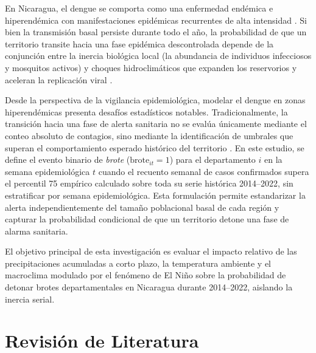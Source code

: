 \documentclass[11pt,a4paper]{article}
\begin{document}
\medskip

En Nicaragua, el dengue se comporta como una enfermedad endémica e hiperendémica con manifestaciones epidémicas recurrentes de alta intensidad \parencite{gordon2013pediatric}. Si bien la transmisión basal persiste durante todo el año, la probabilidad de que un territorio transite hacia una fase epidémica descontrolada depende de la conjunción entre la inercia biológica local (la abundancia de individuos infecciosos y mosquitos activos) y choques hidroclimáticos que expanden los reservorios y aceleran la replicación viral \parencite{anyamba2019global, suazo2026abundance}.

\medskip

Desde la perspectiva de la vigilancia epidemiológica, modelar el dengue en zonas hiperendémicas presenta desafíos estadísticos notables. Tradicionalmente, la transición hacia una fase de alerta sanitaria no se evalúa únicamente mediante el conteo absoluto de contagios, sino mediante la identificación de umbrales que superan el comportamiento esperado histórico del territorio \parencite{paho2002modulos}. En este estudio, se define el evento binario de \textit{brote} ($\text{brote}_{it} = 1$) para el departamento $i$ en la semana epidemiológica $t$ cuando el recuento semanal de casos confirmados supera el percentil 75 empírico calculado sobre toda su serie histórica 2014--2022, sin estratificar por semana epidemiológica. Esta formulación permite estandarizar la alerta independientemente del tamaño poblacional basal de cada región y capturar la probabilidad condicional de que un territorio detone una fase de alarma sanitaria.

\medskip

El objetivo principal de esta investigación es evaluar el impacto relativo de las precipitaciones acumuladas a corto plazo, la temperatura ambiente y el macroclima modulado por el fenómeno de El Niño sobre la probabilidad de detonar brotes departamentales en Nicaragua durante 2014--2022, aislando la inercia serial.

\section{Revisión de Literatura}
\end{document}
